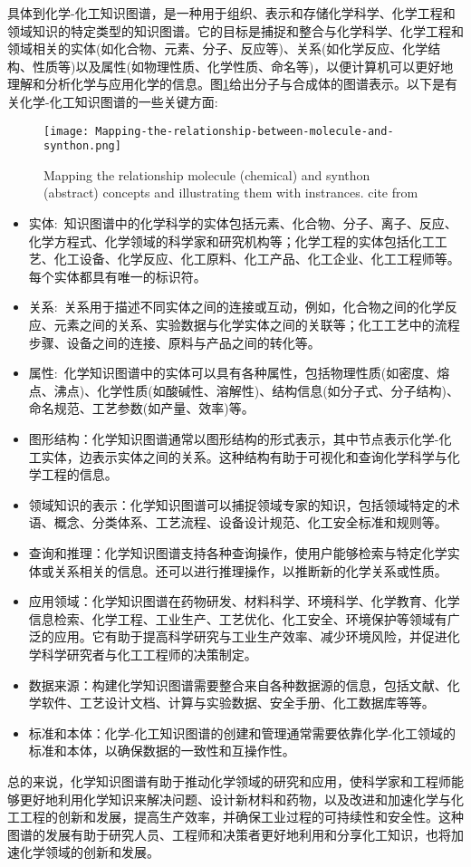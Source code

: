 具体到化学-化工知识图谱，是一种用于组织、表示和存储化学科学、化学工程和领域知识的特定类型的知识图谱。它的目标是捕捉和整合与化学科学、化学工程和领域相关的实体(如化合物、元素、分子、反应等)、关系(如化学反应、化学结构、性质等)以及属性(如物理性质、化学性质、命名等)，以便计算机可以更好地理解和分析化学与应用化学的信息。图\ref{Fig:Mapping-relationship-molecule-synthon}给出分子与合成体的图谱表示。以下是有关化学-化工知识图谱的一些关键方面: 
\begin{figure}[h!]
\centering
\texttt{[image: Mapping-the-relationship-between-molecule-and-synthon.png]}
\caption{\small\textrm{Mapping the relationship molecule (chemical) and synthon (abstract) concepts and illustrating them with instrances. cite from\cite{ACR56-128_2023}}}%
\label{Fig:Mapping-relationship-molecule-synthon}
\end{figure}
\begin{itemize}
	\item 实体:~知识图谱中的化学科学的实体包括元素、化合物、分子、离子、反应、化学方程式、化学领域的科学家和研究机构等；化学工程的实体包括化工工艺、化工设备、化学反应、化工原料、化工产品、化工企业、化工工程师等。每个实体都具有唯一的标识符。
	\item 关系:~关系用于描述不同实体之间的连接或互动，例如，化合物之间的化学反应、元素之间的关系、实验数据与化学实体之间的关联等；化工工艺中的流程步骤、设备之间的连接、原料与产品之间的转化等。
	\item 属性:~化学知识图谱中的实体可以具有各种属性，包括物理性质(如密度、熔点、沸点)、化学性质(如酸碱性、溶解性)、结构信息(如分子式、分子结构)、命名规范、工艺参数(如产量、效率)等。
	\item 图形结构：化学知识图谱通常以图形结构的形式表示，其中节点表示化学-化工实体，边表示实体之间的关系。这种结构有助于可视化和查询化学科学与化学工程的信息。
	\item 领域知识的表示：化学知识图谱可以捕捉领域专家的知识，包括领域特定的术语、概念、分类体系、工艺流程、设备设计规范、化工安全标准和规则等。
	\item 查询和推理：化学知识图谱支持各种查询操作，使用户能够检索与特定化学实体或关系相关的信息。还可以进行推理操作，以推断新的化学关系或性质。
	\item 应用领域：化学知识图谱在药物研发、材料科学、环境科学、化学教育、化学信息检索、化学工程、工业生产、工艺优化、化工安全、环境保护等领域有广泛的应用。它有助于提高科学研究与工业生产效率、减少环境风险，并促进化学科学研究者与化工工程师的决策制定。
	\item 数据来源：构建化学知识图谱需要整合来自各种数据源的信息，包括文献、化学软件、工艺设计文档、计算与实验数据、安全手册、化工数据库等等。
	\item 标准和本体：化学-化工知识图谱的创建和管理通常需要依靠化学-化工领域的标准和本体，以确保数据的一致性和互操作性。
\end{itemize} 
总的来说，化学知识图谱有助于推动化学领域的研究和应用，使科学家和工程师能够更好地利用化学知识来解决问题、设计新材料和药物，以及改进和加速化学与化工工程的创新和发展，提高生产效率，并确保工业过程的可持续性和安全性。这种图谱的发展有助于研究人员、工程师和决策者更好地利用和分享化工知识，也将加速化学领域的创新和发展。

